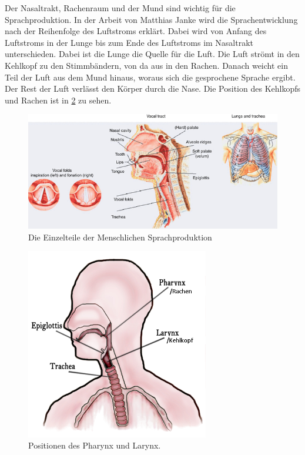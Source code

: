Der Nasaltrakt, Rachenraum und der Mund sind wichtig für die Sprachproduktion. In der Arbeit von Matthias Janke \cite{janke2016emg} wird die Sprachentwicklung nach der Reihenfolge des Luftstroms erklärt. Dabei wird von Anfang des Luftstroms in der Lunge bis zum Ende des Luftstroms im Nasaltrakt unterschieden. Dabei ist die Lunge die Quelle für die Luft. Die Luft strömt in den Kehlkopf zu den Stimmbändern, von da aus in den Rachen. Danach weicht ein Teil der Luft aus dem Mund hinaus, woraus sich die gesprochene Sprache ergibt. Der Rest der Luft verlässt den Körper durch die Nase. Die Position des Kehlkopfs und Rachen ist in \ref{fig:sp1111} zu sehen.


\begin{figure}[H]
  \includegraphics[width=130mm,scale=1]{humanSpeech.png}
  \caption{Die Einzelteile der Menschlichen Sprachproduktion \cite{Docio-Fernandez2015} }
  \label{fig:sp1}
\end{figure}

\begin{figure}[H]
  \includegraphics[width=80mm,scale=1]{ThroatDiagram.png}
  \caption{Positionen des Pharynx und Larynx. \cite{Wikimedia-Common4}}
  \label{fig:sp1111}
\end{figure}
  


